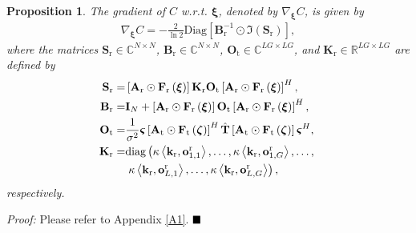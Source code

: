 \documentclass[lettersize,journal]{IEEEtran}
\newtheorem{proposition}{\textbf{Proposition}}
\begin{document}
\begin{proposition}
 The gradient of $C$ \emph{w.r.t.} $\boldsymbol{\xi}$, denoted by $\nabla_{\boldsymbol{\xi} } C$, is given by
\begin{align}
 \nabla_{\boldsymbol{\xi} } C = -\frac{2}{ \ln 2}\textrm{Diag}\left [ \mathbf{B}_{\textrm{r}}^{-1}\odot\Im \left ( \mathbf{S}_{\textrm{r}}\right ) \right ], \label{eq34}
\end{align}
where the matrices $\mathbf{S}_{\textrm{r}}\in\mathbb{C}^{N \times N}$, $\mathbf{B}_{\textrm{r}}\in\mathbb{C}^{N \times N}$, $\mathbf{O}_{\textrm{t}}\in\mathbb{C}^{LG \times LG}$, and $\mathbf{K}_{\textrm{r}}\in\mathbb{R}^{LG \times LG}$ are defined by
\begin{align}
 \mathbf{S}_{\textrm{r}}=&\left [ \mathbf{A}_{\textrm{r}}\odot \mathbf{F}_{\textrm{r}}\left ( \boldsymbol{\xi} \right ) \right ]\mathbf{K}_{\textrm{r}}\mathbf{O}_{\textrm{t}}\left [ \mathbf{A}_{\textrm{r}}\odot \mathbf{F}_{\textrm{r}}\left ( \boldsymbol{\xi} \right ) \right ]^{H}, \label{eq35}\\
 \mathbf{B}_{\textrm{r}}=&\mathbf{I}_{N}+\left [ \mathbf{A}_{\textrm{r}}\odot \mathbf{F}_{\textrm{r}}\left ( \boldsymbol{\xi} \right ) \right ]\mathbf{O}_{\textrm{t}}\left [ \mathbf{A}_{\textrm{r}}\odot \mathbf{F}_{\textrm{r}}\left ( \boldsymbol{\xi} \right )\right ]^{H} , \label{eq36}\\
 \mathbf{O}_{\textrm{t}}=&\frac{1}{\sigma ^{2}}\boldsymbol{\varsigma } \left [ \mathbf{A}_{\textrm{t}}\odot \mathbf{F}_{\textrm{t}}\left ( \boldsymbol{\zeta} \right ) \right ]^{H}\hat{\mathbf{T}}\left [ \mathbf{A}_{\textrm{t}}\odot \mathbf{F}_{\textrm{t}}\left ( \boldsymbol{\zeta} \right ) \right ]\boldsymbol{\varsigma }^{H},\\
 \mathbf{K}_{\textrm{r}}=&\textrm{diag}\left ( \kappa \left \langle \mathbf{k}_{\textrm{r}},\mathbf{o}_{1,1}^{\textrm{r}} \right \rangle ,\ldots,\kappa \left \langle \mathbf{k}_{\textrm{r}},\mathbf{o}_{1,G}^{\textrm{r}} \right \rangle ,\ldots ,\right . \notag\\
 &\left. \kappa \left \langle \mathbf{k}_{\textrm{r}},\mathbf{o}_{L,1}^{\textrm{r}} \right \rangle ,\ldots, \kappa \left \langle \mathbf{k}_{\textrm{r}},\mathbf{o}_{L,G}^{\textrm{r}} \right \rangle \right ),
\end{align}
respectively.
\end{proposition}


\emph{Proof:} Please refer to Appendix \ref{A1}. $\hfill\blacksquare$
\end{document}
